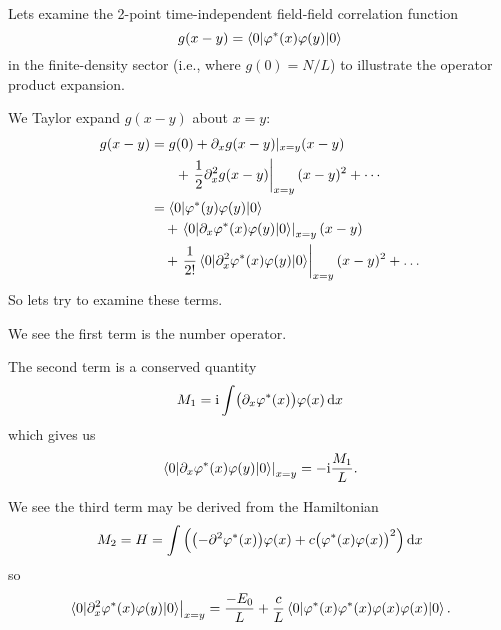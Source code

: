 Lets examine the 2-point time-independent field-field correlation
function
\begin{equation}
g(x-y)=\braket{0|\varphi^{*}(x)\varphi(y)|0}
\end{equation}
in the finite-density sector (i.e., where $g(0)=N/L$) to illustrate the
operator product expansion.

We Taylor expand $g(x-y)$ about $x=y$:
\begin{subequations}
\begin{align}
g(x-y)
&= g(0)
   + \partial_{x}g(x-y)|_{x=y}(x-y) \nonumber\\
&\phantom{=}\quad
   + \left.\frac{1}{2}\partial_{x}^{2}g(x-y)\right|_{x=y}(x-y)^{2}
   + \cdots\\
&= \braket{0|\varphi^{*}(y)\varphi(y)|0}\\
&\quad + \left.\braket{0|\partial_{x}\varphi^{*}(x)\varphi(y)|0}\right|_{x=y} (x-y)\nonumber\\
&\quad + \left.\frac{1}{2!}\braket{0|\partial_{x}^{2}\varphi^{*}(x)\varphi(y)|0}\right|_{x=y}
   (x-y)^{2}
   + \dots\nonumber
\end{align}
\end{subequations}
So lets try to examine these terms.

We see the first term is the number operator. 

The second term is a conserved quantity
\begin{equation}
M_{1} = \mathrm{i}\int\bigl(\partial_{x}\varphi^{*}(x)\bigr)\varphi(x)\,\mathrm{d} x
\end{equation}
which gives us
\begin{equation}
\left.\braket{0|\partial_{x}\varphi^{*}(x)\varphi(y)|0}\right|_{x=y}
=-\mathrm{i}\frac{M_{1}}{L}.
\end{equation}

We see the third term may be derived from the Hamiltonian
\begin{equation}
M_{2} = H = \int\left(\bigl(-\partial^{2}\varphi^{*}(x)\bigr)\varphi(x)
+ c \bigl(\varphi^{*}(x)\varphi(x)\bigr)^{2}\right)\mathrm{d} x
\end{equation}
so
\begin{equation}
\left.\braket{0|\partial_{x}^{2}\varphi^{*}(x)\varphi(y)|0}\right|_{x=y}
=\frac{-E_{0}}{L}+\frac{c}{L}\braket{0|\varphi^{*}(x)\varphi^{*}(x)\varphi(x)\varphi(x)|0}.
\end{equation}

